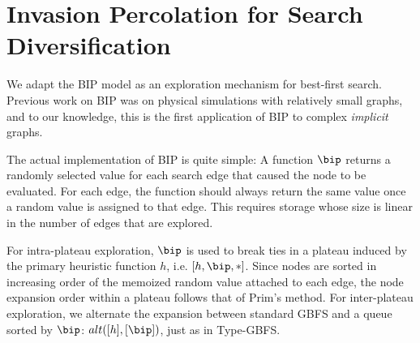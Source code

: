 \section{Invasion Percolation for Search Diversification}
We adapt the BIP model as an exploration mechanism for best-first search.
Previous work on BIP was on physical simulations with relatively small graphs, 
and to our knowledge, this is the first application of BIP  to complex \emph{implicit} graphs.


The actual implementation of BIP is quite simple:
A %
function $\bip$ returns a randomly selected value 
for each search edge that caused the node to be evaluated.
For each edge, the function should always return the same value  once a random value is assigned to that edge. This requires storage whose size is linear in the number of edges that are explored.


For intra-plateau exploration, $\bip$ is used to break ties in a plateau induced by the primary heuristic function $h$, i.e. $[h,\bip,*]$.
Since nodes are sorted in increasing order of the memoized random value attached to each edge, the node expansion order within a plateau follows that of Prim's method.
For inter-plateau exploration, we alternate the expansion between standard GBFS and a queue sorted by $\bip$: $\mit{alt}([h],[\bip])$, just as in Type-GBFS.


